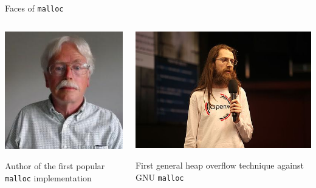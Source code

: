\documentclass[9pt,aspectratio=169]{beamer}
\begin{document}
\begin{frame}[label={sec:org585b173},fragile]{Faces of \texttt{malloc}}
 \begin{columns}
\begin{column}[t]{0.49\columnwidth}
\begin{center}
\includegraphics[width=.8\linewidth]{./douglea.jpg}
\end{center}

Author of the first popular \texttt{malloc} implementation
\end{column}
\begin{column}[t]{0.49\columnwidth}
\begin{center}
\includegraphics[width=\linewidth]{./solardesigner.jpg}
\end{center}

First general heap overflow technique against GNU \texttt{malloc}
\end{column}
\end{columns}
\end{frame}
\end{document}
